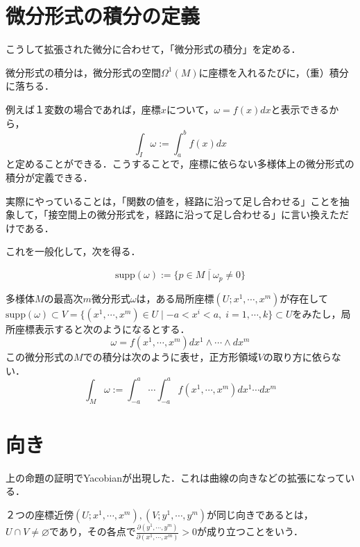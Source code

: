 \documentclass[uplatex, dvipdfmx]{jsreport}
\begin{document}
\section{微分形式の積分の定義}
こうして拡張された微分に合わせて，「微分形式の積分」を定める．

\begin{example}
    微分形式の積分は，微分形式の空間$\Omega^1(M)$に座標を入れるたびに，（重）積分に落ちる．

    例えば１変数の場合であれば，座標$x$について，$\omega=f(x)dx$と表示できるから，
    \[ \int_I\omega:=\int^b_af(x)dx \]
    と定めることができる．こうすることで，座標に依らない多様体上の微分形式の積分が定義できる．

    実際にやっていることは，「関数の値を，経路に沿って足し合わせる」ことを抽象して，「接空間上の微分形式を，経路に沿って足し合わせる」に言い換えただけである．

    これを一般化して，次を得る．
\end{example}

\begin{definition}
    \[\mathrm{supp} (\omega):=\overline{\{ p\in M\mid \omega_p\ne 0 \}} \]
\end{definition}

\begin{proposition}
    多様体$M$の最高次$m$微分形式$\omega$は，ある局所座標$(U;x^1,\cdots,x^m)$が存在して
    $\mathrm{supp}(\omega)\subset V=\{ (x^1,\cdots,x^m)\in U\mid -a<x^i<a,\; i=1,\cdots,k \}\subset U$をみたし，局所座標表示すると次のようになるとする．
    \[ \omega = f(x^1,\cdots,x^m)dx^1\wedge\cdots\wedge dx^m \]
    この微分形式の$M$での積分は次のように表せ，正方形領域$V$の取り方に依らない．
    \[ \int_M\omega := \int^a_{-a}\cdots\int^a_{-a}f(x^1,\cdots,x^m)dx^1\cdots dx^m \]
\end{proposition}

\section{向き}

上の命題の証明でYacobianが出現した．これは曲線の向きなどの拡張になっている．
\begin{definition}[座標近傍の向き]
    ２つの座標近傍$(U;x^1,\cdots,x^m),(V;y^1,\cdots,y^m)$が同じ向きであるとは，$U\cap V\ne\varnothing$であり，その各点で$\frac{\partial (y^1,\cdots,y^m)}{\partial (x^1,\cdots,x^m)}>0$が成り立つことをいう．
\end{definition}
\end{document}
